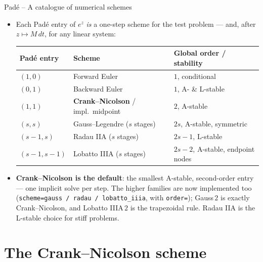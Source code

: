 \documentclass[11pt,aspectratio=169]{beamer}
\begin{document}
\begin{frame}{Padé -- A catalogue of numerical schemes}

\begin{itemize}

\item Each Padé entry of $e^z$ \emph{is} a one-step scheme for the
  test problem — and, after $z\mapsto M\, dt$, for any linear system:
  \begin{center}
    \scriptsize
    \renewcommand{\arraystretch}{1.2}
    \begin{tabular}{lll}
      \toprule
      Padé entry & Scheme & Global order / stability \\
      \midrule
      $(1,0)$       & Forward Euler                              & $1$, conditional \\
      $(0,1)$       & Backward Euler                             & $1$, A- \& L-stable \\
      $(1,1)$       & \textbf{Crank--Nicolson} / impl.\ midpoint & $2$, A-stable \\
      $(s,s)$       & Gauss--Legendre ($s$ stages)               & $2s$, A-stable, symmetric \\
      $(s{-}1,s)$   & Radau IIA ($s$ stages)                     & $2s{-}1$, L-stable \\
      $(s{-}1,s{-}1)$ & Lobatto IIIA ($s$ stages)                & $2s{-}2$, A-stable, endpoint nodes \\
      \bottomrule
    \end{tabular}
  \end{center}

\medskip

\item \textbf{Crank--Nicolson is the default}: the smallest A-stable,
  second-order entry — one implicit solve per step. The higher families
  are now implemented too (\texttt{scheme=gauss\,/\,radau\,/\,lobatto\_iiia},
  with \texttt{order=}); Gauss\,$2$ is exactly Crank--Nicolson, and
  Lobatto IIIA\,$2$ is the trapezoidal rule. Radau IIA is the L-stable
  choice for stiff problems.

\end{itemize}

\end{frame}

\section{The Crank--Nicolson scheme}
\end{document}
